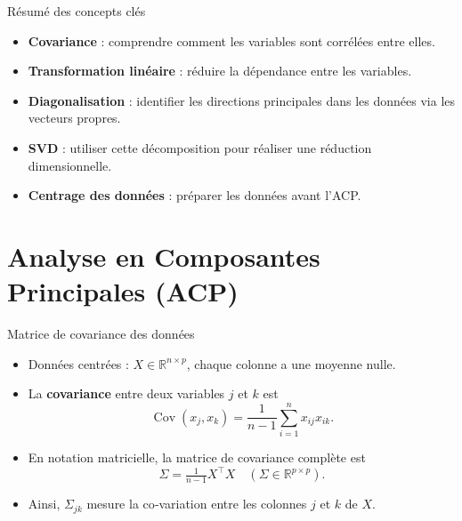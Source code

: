 \documentclass{beamer}
\begin{document}
\begin{frame}{Résumé des concepts clés}
\begin{itemize}
    \item \textbf{Covariance} : comprendre comment les variables sont corrélées entre elles.
    \item \textbf{Transformation linéaire} : réduire la dépendance entre les variables.
    \item \textbf{Diagonalisation} : identifier les directions principales dans les données via les vecteurs propres.
    \item \textbf{SVD} : utiliser cette décomposition pour réaliser une réduction dimensionnelle.
    \item \textbf{Centrage des données} : préparer les données avant l'ACP.
\end{itemize}
\end{frame}

\section{Analyse en Composantes Principales (ACP)}


\begin{frame}{Matrice de covariance des données}
\begin{itemize}
  \item Données centrées : $X\in\mathbb{R}^{n\times p}$, chaque colonne a une moyenne nulle.
  \item La \textbf{covariance} entre deux variables $j$ et $k$ est
        \[\operatorname{Cov}(x_{j},x_{k}) = \frac{1}{n-1}\sum_{i=1}^n x_{ij}x_{ik}.\]
  \item En notation matricielle, la matrice de covariance complète est
        \[\boxed{\Sigma = \tfrac{1}{n-1} X^{\top} X}\quad (\Sigma\in\mathbb{R}^{p\times p}).\]
  \item Ainsi, $\Sigma_{jk}$ mesure la co‑variation entre les colonnes $j$ et $k$ de $X$.
\end{itemize}
\end{frame}

\end{document}
